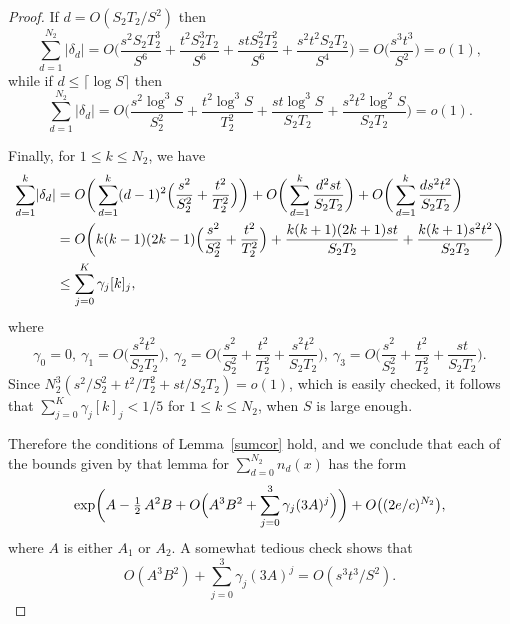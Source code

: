 \documentclass[12pt]{article}
\numberwithin{equation}{section}
\def\({\bigl(}   \def\){\bigr)}
\def\abs#1{\mathopen|#1\mathclose|} \let\card=\abs
\def\ff#1#2{[#1]_{#2}}
\begin{document}
\begin{proof}
If $d= O(S_2T_2/S^2)$ then
\[ \sum_{d=1}^{N_2} \abs{\delta_d} = 
            O\biggl(\frac{s^2 S_2T_2^3}{S^6} +
                    \frac{t^2 S_2^3T_2}{S^6} + 
                     \frac{stS_2^2T_2^2}{S^6} +
                                \frac{s^2t^2S_2T_2}{S^4}\biggr)
     = O\biggl(\frac{s^3t^3}{S^2}\biggr)
     = o(1),
\]
while if $d\leq \lceil \log S\rceil$ then
\[ \sum_{d=1}^{N_2} \abs{\delta_d}
           = O\biggl(\frac{s^2 \log^3 S}{S_2^2} + 
                            \frac{t^2\log^3 S }{T_2^2} +
                            \frac{st\log^3 S}{S_2T_2} + 
                         \frac{s^2t^2\log^2 S}{S_2T_2}\biggr)
            = o(1).
\]

Finally, for $1\le k\le N_2$, we have
\begin{align*}
 \sum_{d=1}^k \abs{\delta_d} &= 
    O\biggl(\, \sum_{d=1}^k (d-1)^2 
        \Bigl({\frac{s^2}{S_2^2}} + {\frac{t^2}{T_2^2}}\Bigr)\biggr)
    + O\biggl(\,\sum_{d=1}^k {\frac{d^2st}{S_2T_2}}\biggr) +  
       O\biggl(\,\sum_{d=1}^k {\frac{ds^2t^2}{S_2T_2}}\biggr) \\
  &= O\biggl(k(k-1)(2k-1)
        \Bigl({\frac{s^2}{S_2^2}} + {\frac{t^2}{T_2^2}}\Bigr)
       + {\frac{k(k+1)(2k+1)st}{S_2T_2}} + 
                         {\frac{k(k+1)s^2t^2}{S_2T_2}}\biggr)\\
    &\le \sum_{j=0}^K \gamma_j \ff kj,
\end{align*}
where
\[ \gamma_0=0,\
 \gamma_1 = O\biggl({\frac{s^2t^2}{S_2T_2}}\biggr),\
\gamma_2 = O\biggl({\frac{s^2}{S_2^2}} + {\frac{t^2}{T_2^2}} +
                     {\frac{s^2t^2}{S_2T_2}}\biggr),\
\gamma_3 = O\biggl({\frac{s^2}{S_2^2}} + {\frac{t^2}{T_2^2}} +
                     {\frac{st}{S_2T_2}}\biggr).\]
Since  $N_2^3(s^2/S_2^2 + t^2/T_2^2 + st/S_2T_2) = o(1)$,
which is easily checked, it 
follows that $\sum_{j=0}^K \gamma_j \ff kj< 1/5$ for $1\leq k\leq N_2$,
when $S$ is large enough.

\smallskip

Therefore the conditions of Lemma~\ref{sumcor} hold,
and we conclude that each of the bounds given by that
lemma for $\sum_{d=0}^{N_2} n_d(x)$ has the form
$$ \exp\biggl(A - \tfrac{1}{2}\,A^2B +
         O\Bigl(A^3B^2 + \sum_{j=0}^3 \gamma_j (3A)^j\Bigr)\biggr) +
              O\((2e/c)^{N_2}\), $$
where $A$ is either $A_1$ or $A_2$.
A somewhat tedious check shows that
$$O(A^3B^2)+\sum_{j=0}^3 \gamma_j (3A)^j=O(s^3t^3/S^2).$$


\end{proof}
\end{document}
